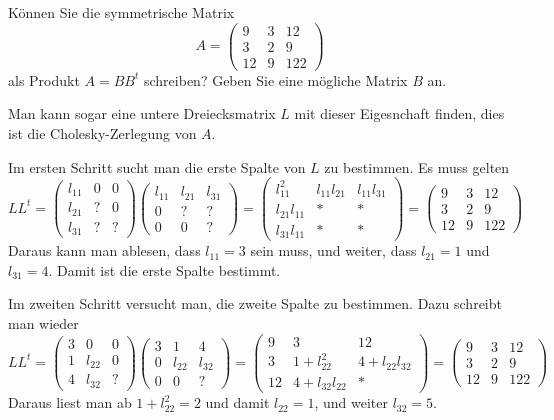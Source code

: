 Können Sie die symmetrische Matrix
\[
A=\begin{pmatrix}
 9& 3& 12\\
 3& 2&  9\\
12& 9&122
\end{pmatrix}
\]
als Produkt $A=BB^t$ schreiben? Geben Sie eine mögliche Matrix $B$ an.


\begin{loesung}
Man kann sogar eine untere Dreiecksmatrix $L$ mit dieser Eigesnchaft finden,
dies ist die Cholesky-Zerlegung von $A$.

Im ersten Schritt sucht man die erste Spalte von $L$ zu bestimmen.
Es muss gelten
\[
LL^t=
\begin{pmatrix}
l_{11}&  0&  0\\
l_{21}&  ?&  0\\
l_{31}&  ?&  ?
\end{pmatrix}
\begin{pmatrix}
l_{11}&l_{21}&l_{31}\\
     0&     ?&     ?\\
     0&     0&     ?
\end{pmatrix}
=
\begin{pmatrix}
    l_{11}^2&l_{11}l_{21}&l_{11}l_{31}\\
l_{21}l_{11}&           *&           *\\
l_{31}l_{11}&           *&           *
\end{pmatrix}
=
\begin{pmatrix}
 9& 3& 12\\
 3& 2&  9\\
12& 9&122
\end{pmatrix}
\]
Daraus kann man ablesen, dass $l_{11}=3$ sein muss, und weiter,
dass
$l_{21}=1$ und $l_{31}=4$. Damit ist die erste Spalte bestimmt.

Im zweiten Schritt versucht man, die zweite Spalte zu bestimmen.
Dazu schreibt man wieder
\[
LL^t
=
\begin{pmatrix}
3&     0&0\\
1&l_{22}&0\\
4&l_{32}&?
\end{pmatrix}
\begin{pmatrix}
3&     1&     4\\
0&l_{22}&l_{32}\\
0&     0&?
\end{pmatrix}
=
\begin{pmatrix}
 9&3           &          12\\
 3& 1+l_{22}^2  &4+l_{22}l_{32}\\
12& 4+l_{32}l_{22}&         *
\end{pmatrix}
=
\begin{pmatrix}
 9& 3& 12\\
 3& 2&  9\\
12& 9&122
\end{pmatrix}
\]
Daraus liest man ab $1+l_{22}^2=2$ und damit $l_{22}=1$, und weiter
$l_{32}=5$.


\end{loesung}
